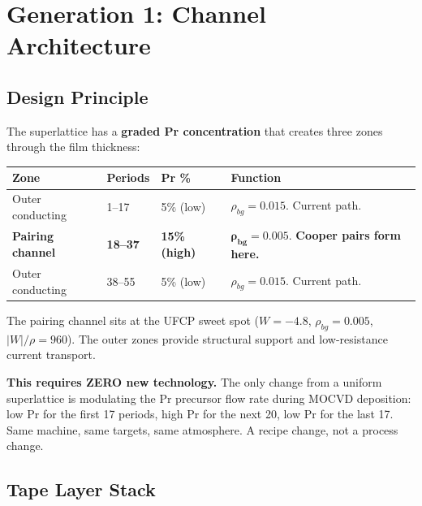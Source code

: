 \documentclass[11pt, a4paper]{article}
\begin{document}
\section{Generation 1: Channel Architecture}
\label{sec:gen1}

\subsection{Design Principle}

The superlattice has a \textbf{graded Pr concentration} that creates
three zones through the film thickness:

\begin{center}
\begin{tabular}{@{}llll@{}}
\toprule
\textbf{Zone} & \textbf{Periods} & \textbf{Pr \%} & \textbf{Function} \\
\midrule
Outer conducting & 1--17 & 5\% (low) & $\rho_{bg} = 0.015$. Current path. \\
\textbf{Pairing channel} & \textbf{18--37} & \textbf{15\% (high)} &
  $\mathbf{\rho_{bg} = 0.005}$. \textbf{Cooper pairs form here.} \\
Outer conducting & 38--55 & 5\% (low) & $\rho_{bg} = 0.015$. Current path. \\
\bottomrule
\end{tabular}
\end{center}

The pairing channel sits at the UFCP sweet spot ($W = -4.8$,
$\rho_{bg} = 0.005$, $|W|/\rho = 960$). The outer zones provide
structural support and low-resistance current transport.

\textbf{This requires ZERO new technology.} The only change from a
uniform superlattice is modulating the Pr precursor flow rate during
MOCVD deposition: low Pr for the first 17 periods, high Pr for the
next 20, low Pr for the last 17. Same machine, same targets, same
atmosphere. A recipe change, not a process change.

\subsection{Tape Layer Stack}
\end{document}
